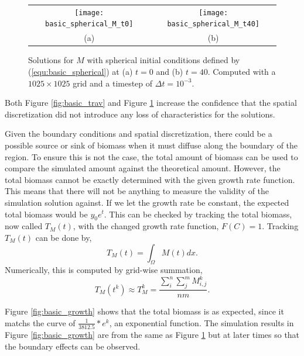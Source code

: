   \begin{figure}
    \centering
    \begin{tabular}{c c}
      \texttt{[image: basic\_spherical\_M\_t0]} & 
      \texttt{[image: basic\_spherical\_M\_t40]} \\
      (a) & (b)
    \end{tabular}
    \caption{Solutions for $M$ with spherical initial conditions defined by (\ref{equ:basic_spherical}) at (a) $t = 0$ and (b) $t = 40$. Computed with a $1025 \times 1025$ grid and a timestep of $\Delta t = 10^{-3}$.}
    \label{fig:basic_spherical}
  \end{figure}
  
  Both Figure \ref{fig:basic_trav} and Figure \ref{fig:basic_spherical} increase the confidence that the spatial discretization did not introduce any loss of characteristics for the solutions.
    
  Given the boundary conditions and spatial discretization, there could be a possible source or sink of biomass when it must diffuse along the boundary of the region.
  To ensure this is not the case, the total amount of biomass can be used to compare the simulated amount against the theoretical amount. 
  However, the total biomass cannot be exactly determined with the given growth rate function.
  This means that there will not be anything to measure the validity of the simulation solution against.
  If we let the growth rate be constant, the expected total biomass would be $y_0 e^t$.
  This can be checked by tracking the total biomass, now called $T_{M}(t)$, with the changed growth rate function, $F(C) = 1$.
  Tracking $T_{M}(t)$ can be done by,
  \begin{equation} \label{equ:total_biomass}
    T_{M}(t) = \int_{\Omega} M(t) dx.
  \end{equation}
  Numerically, this is computed by grid-wise summation,
  \begin{equation}
    T_{M}(t^k) \approx T_{M}^{k} = \frac{ \sum^n_i \sum^m_j M^{k}_{i,j} }{nm}.
  \end{equation}
  
  Figure \ref{fig:basic_growth} shows that the total biomass is as expected, since it matchs the curve of $\frac{1}{3812.5}*e^{k}$, an exponential function.
  The simulation results in Figure \ref{fig:basic_growth} are from the same as Figure \ref{fig:basic_spherical} but at later times so that the boundary effects can be observed.

